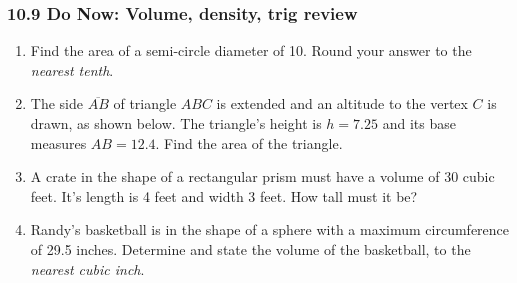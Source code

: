 \documentclass[12pt, twoside]{article}
\begin{document}
\subsubsection*{10.9 Do Now: Volume, density, trig review}
 \begin{enumerate}

   \item Find the area of a semi-circle diameter of 10. Round your answer to the  \emph{nearest tenth}.\vspace{3cm}

   \item The side $\overline{AB}$ of triangle $ABC$ is extended and an altitude to the vertex $C$ is drawn, as shown below. The triangle's height is $h=7.25$ and its base measures $AB=12.4$. Find the area of the triangle.\\[0.25cm]
    \vspace{1.0cm}

  \item A crate in the shape of a rectangular prism must have a volume of 30 cubic feet. It's length is 4 feet and width 3 feet. How tall must it be? \vspace{3.0cm}

  \item Randy’s basketball is in the shape of a sphere with a maximum circumference of 29.5 inches. Determine and state the volume of the basketball, to the \emph{nearest cubic inch}.

\newpage


\end{enumerate}
\end{document}
